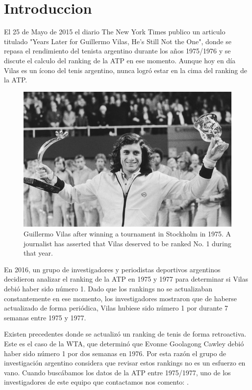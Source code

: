 \section{Introduccion}

El 25 de Mayo de 2015 el diario The New York Times publico un articulo titulado "Years Later for Guillermo Vilas, He's Still Not the One", donde se repasa el rendimiento del tenista argentino durante los años 1975/1976 y se discute el calculo del ranking de la ATP en ese momento. Aunque hoy en día Vilas es un ícono del tenis argentino, nunca logró estar en la cima del ranking de la ATP.

\begin{figure}[H]
  \centering
  \includegraphics[scale=6]{images/nyt}
  \caption{Guillermo Vilas after winning a tournament in Stockholm in 1975. A journalist has asserted that Vilas deserved to be ranked No. 1 during that year. }
\end{figure}

En 2016, un grupo de investigadores y periodistas deportivos argentinos decidieron analizar el ranking de la ATP en 1975 y 1977 para determinar si Vilas debió haber sido número 1. Dado que los rankings no se actualizaban constantemente en ese momento, los investigadores mostraron que de haberse actualizado de forma periódica, Vilas hubiese sido número 1 por durante 7 semanas entre 1975 y 1977.

Existen precedentes donde se actualizó un ranking de tenis de forma retroactiva. Este es el caso de la WTA, que determinó que Evonne Goolagong Cawley debió haber sido número 1 por dos semanas en 1976. Por esta razón el grupo de investigación argentino considera que revisar estos rankings no es un esfuerzo en vano. Cuando buscábamos los datos de la ATP entre 1975/1977, uno de los investigadores de este equipo que contactamos nos comento: .

